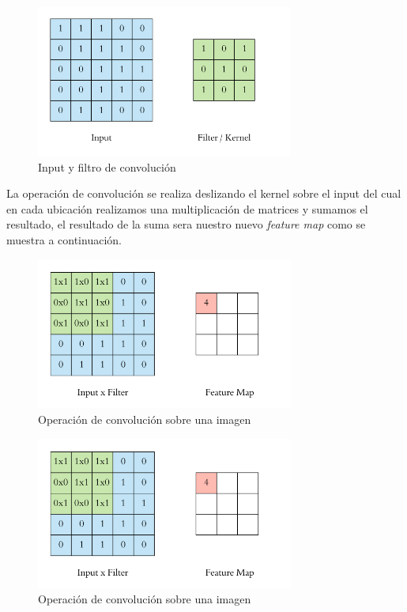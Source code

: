\begin{figure}[H]
 \centering
  \includegraphics[height=5cm,keepaspectratio=true,clip=true]{imagenes/MarcoTeorico/convoluc_1.png}
  \caption{Input y filtro de convolución}
	\label{Fig:filter}
\end{figure}

La operación de convolución se realiza deslizando el kernel sobre el input del cual en cada ubicación realizamos una multiplicación de matrices y sumamos el resultado, el resultado de la suma sera nuestro nuevo \textit{feature map} como se muestra a continuación.

\begin{figure}[H]
 \centering
  \includegraphics[height=5cm,keepaspectratio=true,clip=true]{imagenes/MarcoTeorico/convoluc_2.png}
  \caption{Operación de convolución sobre una imagen} 
\end{figure}

\begin{figure}[H]
 \centering
  \includegraphics[height=5cm,keepaspectratio=true,clip=true]{imagenes/MarcoTeorico/convoluc_2.png}
  \caption{Operación de convolución sobre una imagen}
\end{figure}


